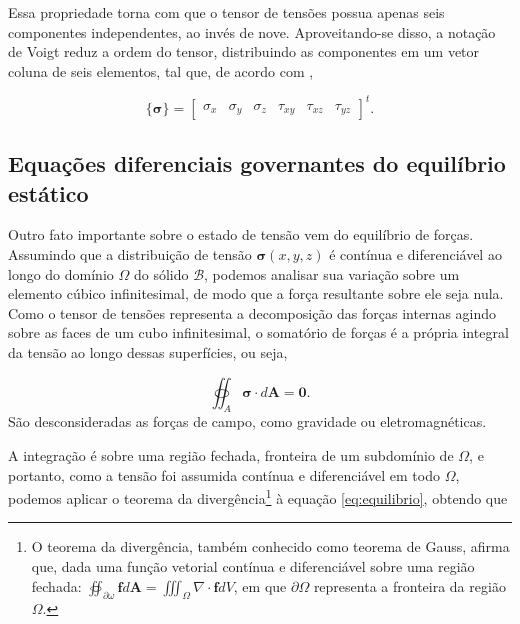 Essa propriedade torna com que o tensor de tensões possua apenas seis componentes independentes, ao invés de nove. Aproveitando-se disso, a notação de Voigt reduz a ordem do tensor, distribuindo as componentes em um vetor coluna de seis elementos, tal que, de acordo com ,

\begin{equation}
    \{\bm{\sigma}\} = \begin{bmatrix}
        \sigma_x & \sigma_y & \sigma_z & \tau_{xy} & \tau_{xz} & \tau_{yz}
    \end{bmatrix}^t.
\end{equation}




\subsection{Equações diferenciais governantes do equilíbrio estático}

Outro fato importante sobre o estado de tensão vem do equilíbrio de forças. Assumindo que a distribuição de tensão $\bm{\sigma}(x,y,z)$ é contínua e diferenciável ao longo do domínio $\Omega$ do sólido $\mathcal{B}$, podemos analisar sua variação sobre um elemento cúbico infinitesimal, de modo que a força resultante sobre ele seja nula. Como o tensor de tensões representa a decomposição das forças internas agindo sobre as faces de um cubo infinitesimal, o somatório de forças é a própria integral da tensão ao longo dessas superfícies, ou seja,

\begin{equation}
    \oiint_A \bm{\sigma} \cdot d\bm{A} = \bm{0}.
    \label{eq:equilibrio}
\end{equation}
São desconsideradas as forças de campo, como gravidade ou eletromagnéticas. \cite[pág. 4, The Equilibrium Equations]{roylance}

A integração é sobre uma região fechada, fronteira de um subdomínio de $\Omega$, e portanto, como a tensão foi assumida contínua e diferenciável em todo $\Omega$, podemos aplicar o teorema da divergência\footnote{O teorema da divergência, também conhecido como teorema de Gauss, afirma que, dada uma função vetorial contínua e diferenciável sobre uma região fechada: $ \oiint_{\partial \omega} \bm{f} d\bm{A} = \iiint_{\Omega} \nabla \cdot \bm{f} dV$, em que $\partial \Omega$ representa a fronteira da região $\Omega$.} à equação \ref{eq:equilibrio}, obtendo que

